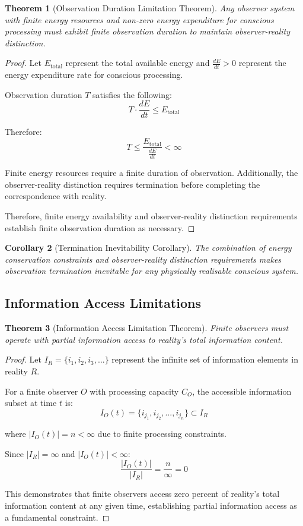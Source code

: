 \documentclass[12pt,a4paper]{article}
\newtheorem{theorem}{Theorem}[section]
\newtheorem{corollary}[theorem]{Corollary}
\begin{document}
\begin{theorem}[Observation Duration Limitation Theorem]
Any observer system with finite energy resources and non-zero energy expenditure for conscious processing must exhibit finite observation duration to maintain observer-reality distinction.
\end{theorem}

\begin{proof}
Let $E_{\text{total}}$ represent the total available energy and $\frac{dE}{dt} > 0$ represent the energy expenditure rate for conscious processing.

Observation duration $T$ satisfies the following:
$$T \cdot \frac{dE}{dt} \leq E_{\text{total}}$$

Therefore:
$$T \leq \frac{E_{\text{total}}}{\frac{dE}{dt}} < \infty$$

Finite energy resources require a finite duration of observation. Additionally, the observer-reality distinction requires termination before completing the correspondence with reality.

Therefore, finite energy availability and observer-reality distinction requirements establish finite observation duration as necessary.
\end{proof}

\begin{corollary}[Termination Inevitability Corollary]
The combination of energy conservation constraints and observer-reality distinction requirements makes observation termination inevitable for any physically realisable conscious system.
\end{corollary}

\subsection{Information Access Limitations}

\begin{theorem}[Information Access Limitation Theorem]
Finite observers must operate with partial information access to reality's total information content.
\end{theorem}

\begin{proof}
Let $I_R = \{i_1, i_2, i_3, ...\}$ represent the infinite set of information elements in reality $R$.

For a  finite observer $O$ with processing capacity $C_O$, the accessible information subset at time $t$ is:
$$I_O(t) = \{i_{j_1}, i_{j_2}, ..., i_{j_n}\} \subset I_R$$

where $|I_O(t)| = n < \infty$ due to finite processing constraints.

Since $|I_R| = \infty$ and $|I_O(t)| < \infty$:
$$\frac{|I_O(t)|}{|I_R|} = \frac{n}{\infty} = 0$$

This demonstrates that finite observers access zero percent of reality's total information content at any given time, establishing partial information access as a fundamental constraint.
\end{proof}
\end{document}

